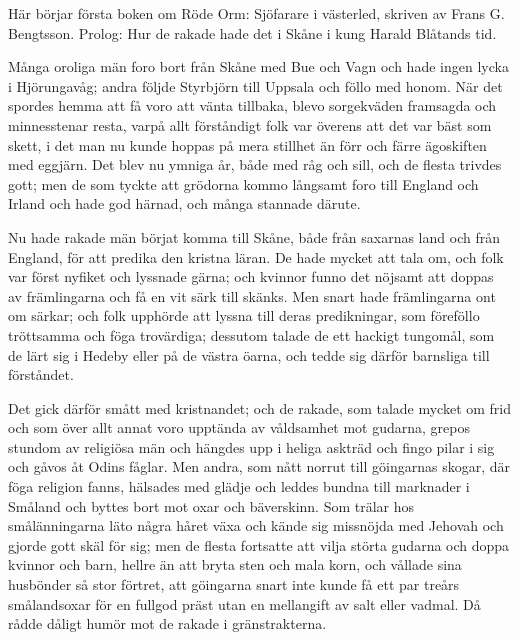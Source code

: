 
%
%


{%
\Red
Här börjar första boken om Röde Orm: Sjöfarare i västerled, skriven av Frans G. Bengtsson. Prolog: Hur de rakade hade det i Skåne i kung Harald Blåtands tid.%
}

\biginitial Många oroliga män foro bort från Skåne med Bue och Vagn och hade ingen lycka i Hjörungavåg; andra följde Styrbjörn till Uppsala och föllo med honom. När det spordes hemma att få voro att vänta tillbaka, blevo sorgekväden framsagda och minnesstenar resta, varpå allt förståndigt folk var överens att det var bäst som skett, i det man nu kunde hoppas på mera stillhet än förr och färre ägoskiften med eggjärn. Det blev nu ymniga år, både med råg och sill, och de flesta trivdes gott; men de som tyckte att grödorna kommo långsamt foro till England och Irland och hade god härnad, och många stannade därute.

\initial Nu hade rakade män börjat komma till Skåne, både från saxarnas land och från England, för att predika den kristna läran. De hade mycket att tala om, och folk var först nyfiket och lyssnade gärna; och kvinnor funno det nöjsamt att doppas av främlingarna och få en vit särk till skänks. Men snart hade främlingarna ont om särkar; och folk upphörde att lyssna till deras predikningar, som föreföllo tröttsamma och föga trovärdiga; dessutom talade de ett hackigt tungomål, som de lärt sig i Hedeby eller på de västra öarna, och tedde sig därför barnsliga till förståndet.

\initial Det gick därför smått med kristnandet; och de rakade, som talade mycket om frid och som över allt annat voro upptända av våldsamhet mot gudarna, grepos stundom av religiösa män och hängdes upp i heliga askträd och fingo pilar i sig och gåvos åt Odins fåglar. Men andra, som nått norrut till göingarnas skogar, där föga religion fanns, hälsades med glädje och leddes bundna till marknader i Småland och byttes bort mot oxar och bäverskinn. Som trälar hos smålänningarna läto några håret växa och kände sig missnöjda med Jehovah och gjorde gott skäl för sig; men de flesta fortsatte att vilja störta gudarna och doppa kvinnor och barn, hellre än att bryta sten och mala korn, och vållade sina husbönder så stor förtret, att göingarna snart inte kunde få ett par treårs smålandsoxar för en fullgod präst utan en mellangift av salt eller vadmal. Då rådde dåligt humör mot de rakade i gränstrakterna.

